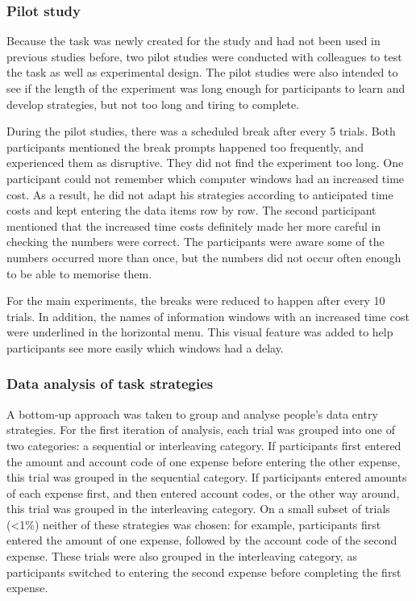 \subsubsection{Pilot study}
Because the task was newly created for the study and had not been used in previous studies before, two pilot studies were conducted with colleagues to test the task as well as experimental design. The pilot studies were also intended to see if the length of the experiment was long enough for participants to learn and develop strategies, but not too long and tiring to complete.

During the pilot studies, there was a scheduled break after every 5 trials. Both participants mentioned the break prompts happened too frequently, and experienced them as disruptive. They did not find the experiment too long. One participant could not remember which computer windows had an increased time cost. As a result, he did not adapt his strategies according to anticipated time costs and kept entering the data items row by row. The second participant mentioned that the increased time costs definitely made her more careful in checking the numbers were correct. The participants were aware some of the numbers occurred more than once, but the numbers did not occur often enough to be able to memorise them. 

For the main experiments, the breaks were reduced to happen after every 10 trials. In addition, the names of information windows with an increased time cost were underlined in the horizontal menu. This visual feature was added to help participants see more easily which windows had a delay.

\subsubsection{Data analysis of task strategies}
A bottom-up approach was taken to group and analyse people's data entry strategies. For the first iteration of analysis, each trial was grouped into one of two categories: a sequential or interleaving category. If participants first entered the amount and account code of one expense before entering the other expense, this trial was grouped in the sequential category. If participants entered amounts of each expense first, and then entered account codes, or the other way around, this trial was grouped in the interleaving category. On a small subset of trials (<1\%) neither of these strategies was chosen: for example, participants first entered the amount of one expense, followed by the account code of the second expense. These trials were also grouped in the interleaving category, as participants switched to entering the second expense before completing the first expense.

